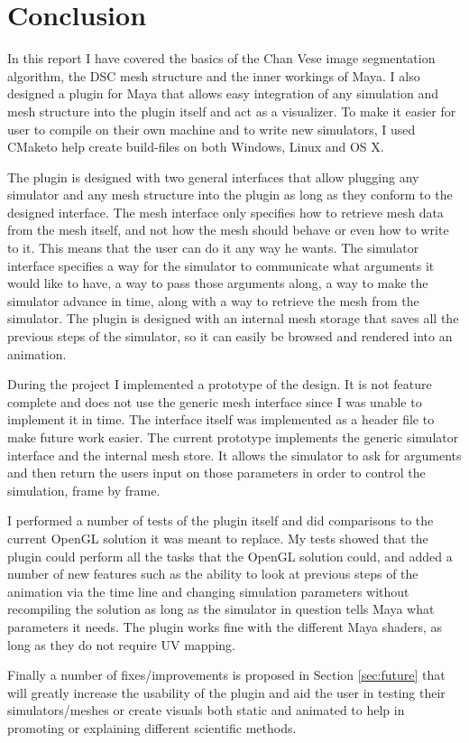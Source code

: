 \section{Conclusion}
In this report I have covered the basics of the Chan Vese image segmentation
algorithm, the DSC mesh structure and the inner workings of Maya. I also
designed a plugin for Maya that allows easy integration of any
simulation and mesh structure into the plugin itself and act as a visualizer. To
make it easier for user to compile on their own machine and to write
new simulators, I used CMaketo help create build-files on both Windows, Linux
and OS X.

The plugin is designed with two general interfaces that allow plugging any
simulator and any mesh structure into the plugin as long as they conform to the
designed interface. The mesh interface only specifies how to retrieve mesh data
from the mesh itself, and not how the mesh should behave or even how to write to
it. This means that the user can do it any way he wants. The simulator interface
specifies a way for the simulator to communicate what arguments it would like to
have, a way to pass those arguments along, a way to make the simulator advance
in time, along with a way to retrieve the mesh from the simulator. The plugin is
designed with an internal mesh storage that saves all the previous steps of the
simulator, so it can easily be browsed and rendered into an animation.

During the project I implemented a prototype of the design. It is not feature
complete and does not use the generic mesh interface since I was unable to
implement it in time. The interface itself was implemented as a header file to
make future work easier. The current prototype implements the generic
simulator interface and the internal mesh store. It allows the simulator to ask
for arguments and then return the users input on those parameters in order to
control the simulation, frame by frame.

I performed a number of tests of the plugin itself and did comparisons to the
current OpenGL solution it was meant to replace. My tests showed that the
plugin could perform all the tasks that the OpenGL solution could, and added a
number of new features such as the ability to look at previous steps of the animation
via the time line and changing simulation parameters without recompiling the
solution as long as the simulator in question tells Maya what parameters it
needs. The plugin works fine with the different Maya shaders, as long as they
do not require UV mapping.

Finally a number of fixes/improvements is proposed in Section \ref{sec:future}
that will greatly increase the usability of the plugin and aid the user
in testing their simulators/meshes or create visuals both static and animated to
help in promoting or explaining different scientific methods.


